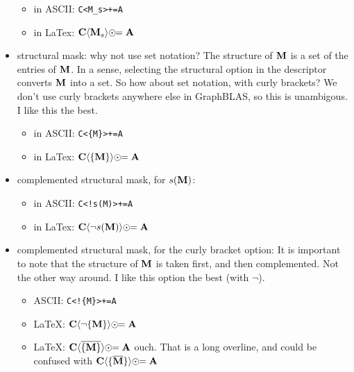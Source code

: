 \documentclass[11pt]{article}
\begin{document}
\begin{itemize}
    \begin{itemize}
    \item[] in ASCII: \verb'C<M_s>+=A'
    \item[] in LaTex:  ${\bf C} \langle {\bf M}_s \rangle \odot\!\!= {\bf A}$
    \end{itemize}

\item structural mask: why not use set notation?  The structure of ${\bf M}$
is a set of the entries of ${\bf M}$.  In a sense, selecting the
structural option in the descriptor converts ${\bf M}$
into a set.  So how about set notation, with curly brackets?
We don't use curly brackets anywhere else in GraphBLAS, so this is unambigous.
I like this the best.

    \begin{itemize}
    \item[] in ASCII: \verb'C<{M}>+=A'
    \item[] in LaTex:  ${\bf C} \langle \{{\bf M}\} \rangle \odot\!\!= {\bf A}$
    \end{itemize}

\item complemented structural mask, for $s({\bf M})$:

    \begin{itemize}
    \item[] in ASCII: \verb'C<!s(M)>+=A'
    \item[] in LaTex:  ${\bf C} \langle \neg s({\bf M}) \rangle \odot\!\!= {\bf A}$
    \end{itemize}

\item  complemented structural mask, for the curly bracket option:
It is important to note that the structure of ${\bf M}$ is taken
first, and then complemented.  Not the other way around.
I like this option the best (with $\neg$).

    \begin{itemize}
    \item[] ASCII: \verb'C<!{M}>+=A'
    \item[] LaTeX: ${\bf C} \langle \neg \{{\bf M}\} \rangle \odot\!\!= {\bf A}$
    \item[] LaTeX:
    ${\bf C} \langle \overline{ \{{\bf M}\}} \rangle \odot\!\!= {\bf A}$
    ouch.  That is a long overline, and could be confused with
    ${\bf C} \langle  \{\overline{\bf M}\} \rangle \odot\!\!= {\bf A}$
    \end{itemize}

\end{itemize}
\end{document}
